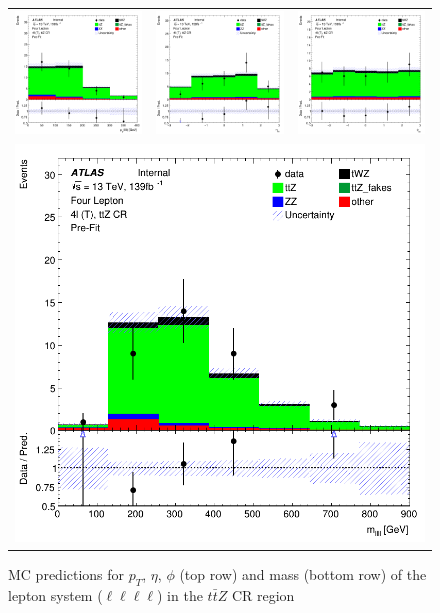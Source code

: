 \begin{figure}[htbp]
\centering
  \begin{tabular}{ccc}

    \includegraphics[width=.2\textwidth]{figures/PreFitPlots/lep4_ttZ_4T_llll_sys_pt}&
    \includegraphics[width=.2\textwidth]{figures/PreFitPlots/lep4_ttZ_4T_llll_sys_eta} &
    \includegraphics[width=.2\textwidth]{figures/PreFitPlots/lep4_ttZ_4T_llll_sys_phi} \\
    \multicolumn{3}{c}{\includegraphics[width=.2\textwidth]{figures/PreFitPlots/lep4_ttZ_4T_llll_sys_mass}}

  \end{tabular}
  \caption{MC predictions for $p_{T}$, $\eta$, $\phi$ (top row) and mass (bottom row) of the lepton system ($\ell \ell \ell \ell$) in the $t\bar{t}Z$ CR region }
  \label{fig:4lep-ttZ-CR-Lep-sys-Plots}
\end{figure}

